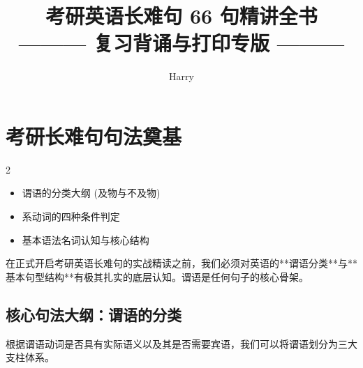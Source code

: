 \documentclass[cn,normal,11pt]{elegantnote}
\title{考研英语长难句 66 句精讲全书\\{\large ——— 复习背诵与打印专版 ———}}
\author{Harry}
\date{}
\newcommand{\introductionname}{内容概要}
\newenvironment{introduction}[1][\introductionname]{
  \begin{tcolorbox}[introductionsty,title={#1}]
    \begin{multicols}{2}
      \begin{itemize}[label=\textcolor{structurecolor}{\SquareShadowBottomRight}]}{
      \end{itemize}
    \end{multicols}
  \end{tcolorbox}}
\begin{document}
\linespread{1.15}\selectfont
\setlength{\parskip}{1.5pt}

\maketitle


\tableofcontents



\section{考研长难句句法奠基}

\begin{introduction}
  \item 谓语的分类大纲 (及物与不及物)
  \item 系动词的四种条件判定
  \item 基本语法名词认知与核心结构
\end{introduction}

在正式开启考研英语长难句的实战精读之前，我们必须对英语的**谓语分类**与**基本句型结构**有极其扎实的底层认知。谓语是任何句子的核心骨架。

\subsection{核心句法大纲：谓语的分类}

根据谓语动词是否具有实际语义以及其是否需要宾语，我们可以将谓语划分为三大支柱体系。
\end{document}
